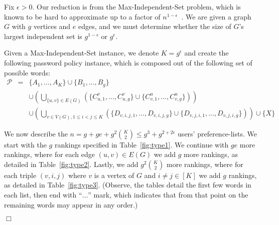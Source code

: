 \documentclass[prodmode,acmec]{ec-acmsmall}
\newcommand{\PasswordSpace}{\mathcal{P}}
\def \QED {\hfill{$\Box$}}
\newenvironment{proofof}[1]{\noindent {\em Proof of #1.  }}{\QED}
\begin{document}
\medskip

\begin{proofof}{Theorem~\ref{thm:HardnessOfApproximationOptimalCombinationOfSubsets}}
Fix $\epsilon>0$. Our reduction is from the Max-Independent-Set problem, which is known to be hard to approximate up to a factor of $n^{1-\epsilon}$~\cite{Hastad96}. 
We are given a graph $G$ with $g$ vertices and $e$ edges, and we must determine whether the size of $G$'s largest independent set is $g^{1-\epsilon}$ or $g^{\epsilon}$.  

Given a Max-Independent-Set instance, we denote $K = g^{\epsilon}$ and create the following password policy instance, which is composed out of the following set of possible words:
\begin{eqnarray*}
\PasswordSpace &=& \{A_1,...,A_K\} \cup \{B_1,...,B_g\}  \\
&&\cup \left( \bigcup_{\{u,v\} \in E(G)} \left(\{C_{u,1}^v,...,C_{u,g}^v\} \cup \{C_{v,1}^u,...,C_{v,g}^u \}  \right)\right) \\
&&\cup  \left( \bigcup_{v \in V(G), 1\leq i < j \leq K} (\{D_{v,i,j,1},...,D_{v,i,j,g}\} \cup  \{D_{v,j,i,1},...,D_{v,j,i,g}\}) \right) \cup \{X\}
\end{eqnarray*} 

We now describe the $n = g + ge + g^2 \binom K 2 \leq g^3 + g^{2+2\epsilon}$ users' preference-lists. We start with the $g$ rankings specified in Table~\ref{fig:type1}. We continue with $ge$ more rankings, where for each edge $(u,v) \in E(G)$ we add $g$ more rankings, as detailed in Table~\ref{fig:type2}. Lastly, we add $g^2\binom{K} {2}$ more rankings, where for each triple $(v,i,j)$ where $v$ is a vertex of $G$ and $i\neq j \in [K]$ we add $g$ rankings, as detailed in Table~\ref{fig:type3}. (Observe, the tables detail the first few words in each list, then end with ``$\ldots$'' mark, which indicates that from that point on the remaining words may appear in any order.)


\end{proofof}
\end{document}
